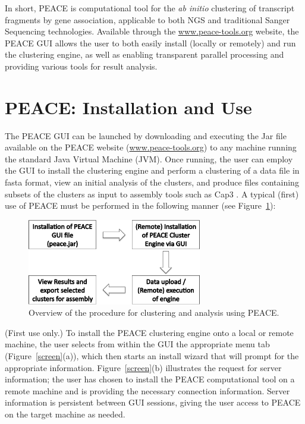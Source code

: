 \documentclass[a4,center,fleqn]{NAR}
\newcommand{\peace} {{\small PEACE}}
\newcommand{\capthree} {{\small Cap3}}
\begin{document}
In short, \peace\/ is computational tool for the {\it ab initio}
clustering of transcript fragments by gene association, applicable to
both NGS and traditional Sanger Sequencing technologies.  Available
through the \href{http://www.peace-tools.org}{www.peace-tools.org}
website, the \peace\/ GUI allows the user to both easily install
(locally or remotely) and run the clustering engine, as well as
enabling transparent parallel processing and providing various tools
for result analysis.

\section{\peace\/: Installation and Use}

The \peace\/ GUI can be launched by downloading and executing the
Jar file available on the \peace\/ website
(\href{http://www.peace-tools.org}{www.peace-tools.org}) to any
machine running the standard Java Virtual Machine (JVM).  Once
running, the user can employ the GUI to install the clustering engine
and perform a clustering of a data file in {\sc fasta} format, view an
initial analysis of the clusters, and produce files containing subsets
of the clusters as input to assembly tools such as \capthree\/ 
\cite{Huang99}.  A typical (first) use of \peace\/ must be
performed in the following manner (see Figure~\ref{fig:workflow}):

\begin{figure}
  \centerline{\includegraphics[width=3in]{screen.d/workflow.pdf}}
  \caption{Overview of the procedure for clustering and analysis using
    PEACE.}\label{fig:workflow}
\end{figure}


 (First use only.) To install the
\peace\/ clustering engine onto a local or remote machine, the user selects
from within the GUI the appropriate menu tab (Figure~\ref{screen}(a)),
which then starts an install wizard that will prompt for the
appropriate information.  Figure~\ref{screen}(b) illustrates the
request for server information; the user has chosen to install the
\peace\/ computational tool on a remote machine and is providing
the necessary connection information.  Server information is
persistent between GUI sessions, giving the user access to \peace\/
on the target machine as needed.
\end{document}
